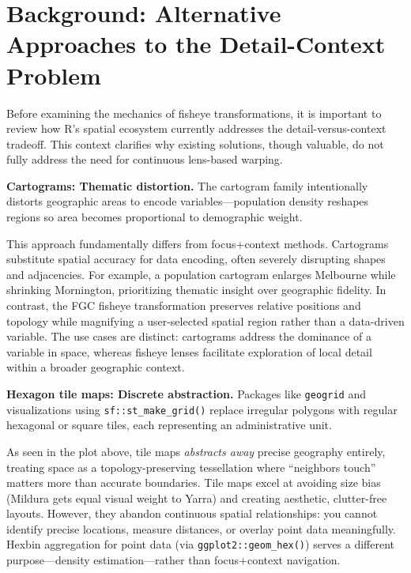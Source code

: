 \section{Background: Alternative Approaches to the Detail-Context Problem}\label{background-alternative-approaches-to-the-detail-context-problem}

Before examining the mechanics of fisheye transformations, it is important to review how R's spatial ecosystem currently addresses the detail-versus-context tradeoff. This context clarifies why existing solutions, though valuable, do not fully address the need for continuous lens-based warping.

\textbf{Cartograms: Thematic distortion.} The cartogram family \citep{gastner2004} intentionally distorts geographic areas to encode variables---population density reshapes regions so area becomes proportional to demographic weight.


This approach fundamentally differs from focus+context methods. Cartograms substitute spatial accuracy for data encoding, often severely disrupting shapes and adjacencies. For example, a population cartogram enlarges Melbourne while shrinking Mornington, prioritizing thematic insight over geographic fidelity. In contrast, the FGC fisheye transformation preserves relative positions and topology while magnifying a user-selected spatial region rather than a data-driven variable. The use cases are distinct: cartograms address the dominance of a variable in space, whereas fisheye lenses facilitate exploration of local detail within a broader geographic context.

\textbf{Hexagon tile maps: Discrete abstraction.} Packages like \texttt{geogrid} and visualizations using \texttt{sf::st\_make\_grid()} replace irregular polygons with regular hexagonal or square tiles, each representing an administrative unit.


As seen in the plot above, tile maps \emph{abstracts away} precise geography entirely, treating space as a topology-preserving tessellation where ``neighbors touch'' matters more than accurate boundaries. Tile maps excel at avoiding size bias (Mildura gets equal visual weight to Yarra) and creating aesthetic, clutter-free layouts. However, they abandon continuous spatial relationships: you cannot identify precise locations, measure distances, or overlay point data meaningfully. Hexbin aggregation for point data (via \texttt{ggplot2::geom\_hex()}) serves a different purpose---density estimation---rather than focus+context navigation.

